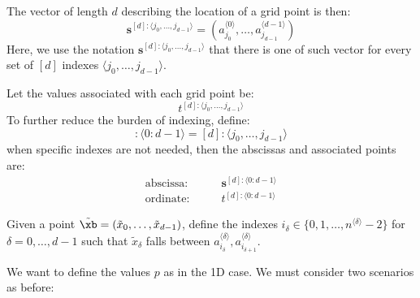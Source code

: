 \documentclass[11pt]{article}
\newcommand{\sbf}{\boldsymbol{s}}
\begin{document}
The vector of length $d$ describing the location of a grid point is then:
\begin{equation}
\sbf^{[d] : \langle j_0,\dots,j_{d-1} \rangle} = \left ( a_{j_0}^{\langle 0 \rangle}, \dots, a_{j_{d-1}}^{\langle d-1 \rangle}  \right )
\end{equation}
Here, we use the notation $\sbf^{[d] : \langle j_0,\dots,j_{d-1} \rangle}$ that there is one of such vector for every set of $[d]$ indexes $\langle j_{0},\dots,j_{d-1} \rangle$.

Let the values associated with each grid point be:
\begin{equation}
t^{[d] : \langle j_0,\dots,j_{d-1} \rangle}
\end{equation}
To further reduce the burden of indexing, define:
\begin{equation}
[d]: \langle 0:d-1 \rangle  = [d]: \langle j_0, \dots, j_{d-1} \rangle
\end{equation}
when specific indexes are not needed, then the abscissas and associated points are:
\begin{equation*}
\begin{split}
\text{abscissa:}& \qquad \sbf^{[d]: \langle 0:d-1 \rangle} \\
\text{ordinate:}& \qquad t^{[d]: \langle 0:d-1 \rangle}
\end{split}
\end{equation*}

Given a point $\tilde{\xb} = (\tilde{x}_0, \dots, \tilde{x}_{d-1})$, define the indexes $i_\delta \in \{ 0, 1, \dots, n^{\langle \delta \rangle}-2 \}$ for $\delta=0,\dots,d-1$ such that $\tilde{x}_\delta$ falls between $a_{i_\delta}^{\langle \delta \rangle}, a_{i_{\delta+1}}^{\langle \delta \rangle}$.

We want to define the values $p$ as in the 1D case. We must consider two scenarios as before:
\end{document}
